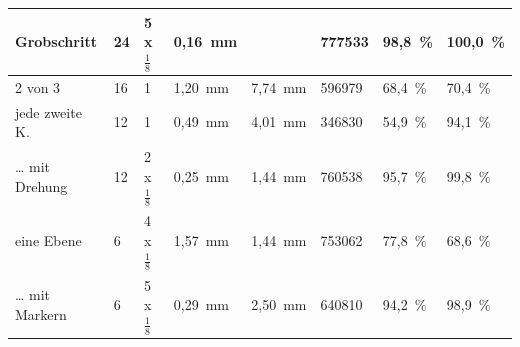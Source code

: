 \documentclass[./00PhotoBox.tex]{subfiles}
\begin{document}
\begin{table}
{\begin{tabular}{l|l|l|l|l|l|l|l}
            Grobschritt    & 24                                                                & 5 x $\frac{1}{8}$        & 0,16~mm                                                             & \cellcolor[HTML]{EEEEEE}                                            & 777533               & 98,8~\%                        & 100,0~\%                       \\ \hline
            2 von 3        & 16                                                                & 1                        & {\color[HTML]{FF0000} 1,20~mm}                                      & {\color[HTML]{FF0000} 7,74~mm}                                      & 596979               & {\color[HTML]{FF0000} 68,4~\%} & {\color[HTML]{FF0000} 70,4~\%} \\ \hline
            jede zweite K. & 12                                                                & 1                        & 0,49~mm                                                             & 4,01~mm                                                             & 346830               & {\color[HTML]{FF0000} 54,9~\%} & 94,1~\%                        \\
            … mit Drehung  & 12                                                                & 2 x $\frac{1}{8}$        & 0,25~mm                                                             & 1,44~mm                                                             & 760538               & 95,7~\%                        & 99,8~\%                        \\ \hline
            eine Ebene     & 6                                                                 & 4 x $\frac{1}{8}$        & {\color[HTML]{FF0000} 1,57~mm}                                      & 1,44~mm                                                             & 753062               & {\color[HTML]{FF0000} 77,8~\%} & {\color[HTML]{FF0000} 68,6~\%} \\
            … mit Markern  & 6                                                                 & 5 x $\frac{1}{8}$        & 0,29~mm                                                             & 2,50~mm                                                             & 640810               & 94,2~\%                        & 98,9~\%
        \end{tabular}
    }
\end{table}
\end{document}
